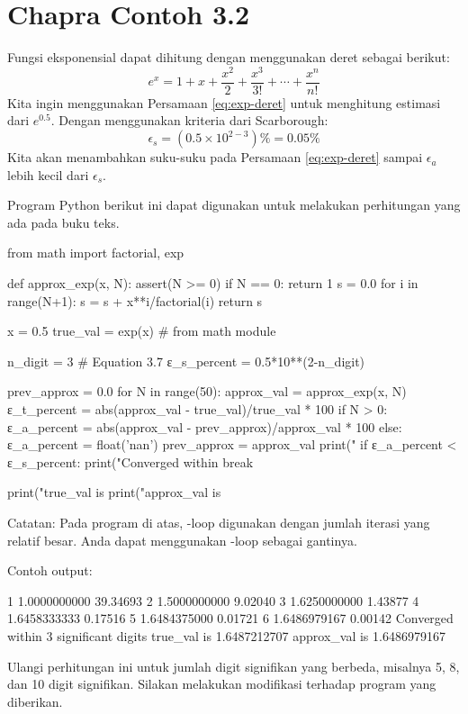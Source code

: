 \section{Chapra Contoh 3.2}
Fungsi eksponensial dapat dihitung dengan menggunakan deret sebagai berikut:
\begin{equation}
e^{x} = 1 + x + \frac{x^2}{2} + \frac{x^3}{3!} + \cdots + \frac{x^n}{n!}
\label{eq:exp-deret}
\end{equation}
Kita ingin menggunakan Persamaan \eqref{eq:exp-deret} untuk menghitung estimasi
dari $e^{0.5}$.
Dengan menggunakan kriteria dari Scarborough:
\begin{equation*}
\epsilon_{s} = (0.5 \times 10^{2-3}) \% = 0.05 \%
\end{equation*}
Kita akan menambahkan suku-suku pada Persamaan \eqref{eq:exp-deret} sampai $\epsilon_{a}$
lebih kecil dari $\epsilon_{s}$.

Program Python berikut ini dapat digunakan untuk melakukan perhitungan yang ada pada buku teks.
\begin{pythoncode}
from math import factorial, exp

def approx_exp(x, N):
  assert(N >= 0)
  if N == 0:
    return 1
  s = 0.0
  for i in range(N+1):
    s = s + x**i/factorial(i)
  return s
  
x = 0.5
true_val = exp(x) # from math module
  
n_digit = 3
# Equation 3.7
ε_s_percent = 0.5*10**(2-n_digit)
  
prev_approx = 0.0
for N in range(50):
  approx_val = approx_exp(x, N)
  ε_t_percent = abs(approx_val - true_val)/true_val * 100
  if N > 0:
    ε_a_percent = abs(approx_val - prev_approx)/approx_val * 100
  else:
    ε_a_percent = float('nan')
  prev_approx = approx_val
  print("%
  if ε_a_percent < ε_s_percent:
    print("Converged within %
    break

print("true_val   is %
print("approx_val is %
\end{pythoncode}

Catatan: Pada program di atas, -loop digunakan dengan jumlah iterasi yang relatif
besar. Anda dapat menggunakan -loop sebagai gantinya.

Contoh output:
\begin{textcode}
  1       1.0000000000   39.34693%
  2       1.5000000000    9.02040%
  3       1.6250000000    1.43877%
  4       1.6458333333    0.17516%
  5       1.6484375000    0.01721%
  6       1.6486979167    0.00142%
Converged within 3 significant digits
true_val   is       1.6487212707
approx_val is       1.6486979167
\end{textcode}


\begin{soal}
Ulangi perhitungan ini untuk jumlah digit signifikan yang berbeda, misalnya 5, 8, dan 10
digit signifikan. Silakan melakukan modifikasi terhadap program yang diberikan.
\end{soal}